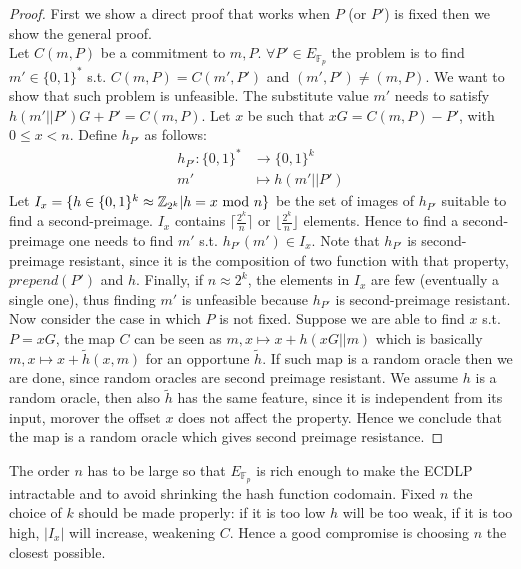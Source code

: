 \begin{proof}
	First we show a direct proof that works when $P$ (or $P'$) is fixed then we show the general proof.
	\\
	Let $C(m,P)$ be a commitment to $m, P$.
	$\forall P' \in E_{\mathbb{F}_p}$ the problem is to find $m' \in \{0,1\}^*$ s.t. $C(m,P)=C(m',P')$ and $(m', P') \neq (m, P)$. We want to show that such problem is unfeasible.
	The substitute value $m'$ needs to satisfy $h(m'||P')G + P'=C(m,P)$.
	Let $x$ be such that $xG = C(m,P) - P'$, with $0\leq x<n$. 
	Define $h_{P'}$ as follows:
	\begin{equation}
	\begin{split}
	h_{P'}:\{0,1\}^* & \rightarrow \{0,1\}^k\\
	m' & \mapsto h(m'||P')
	\end{split}
	\end{equation}
	Let $I_x=\{h \in \{0,1\}^k \approx \mathbb{Z}_{2^k} | h=x\textmd{ mod }n\}$ be the set of images of $h_{P'}$ suitable to find a second-preimage.
	$I_x$ contains  $\lceil\frac{2^k}{n}\rceil$ or $\lfloor\frac{2^k}{n}\rfloor$ elements.
	Hence to find a second-preimage one needs to find $m'$ s.t. $h_{P'}(m') \in I_x$. Note that $h_{P'}$ is second-preimage resistant, since it is the composition of two function with that property, $prepend(P')$ and $h$. Finally, if $n \approx 2^k$, the elements in $I_x$ are few (eventually a single one), thus finding $m'$ is unfeasible because $h_{P'}$ is second-preimage resistant.
	\\
	Now consider the case in which $P$ is not fixed.
	Suppose we are able to find $x$ s.t. $P=xG$, the map $C$ can be seen as $m,x \mapsto x + h(xG||m)$ which is basically $m,x \mapsto x + \tilde{h}(x,m)$ for an opportune $\tilde{h}$.
	If such map is a random oracle then we are done, since random oracles are second preimage resistant.
	We assume $h$ is a random oracle, then also $\tilde{h}$ has the same feature, since it is independent from its input, morover the offset $x$ does not affect the property. 
	Hence we conclude that the map is a random oracle which gives second preimage resistance.
\end{proof}

The order $n$ has to be large so that $E_{\mathbb{F}_p}$ is rich enough to make the ECDLP intractable and to avoid shrinking the hash function codomain. Fixed $n$ the choice of $k$ should be made properly: if it is too low $h$ will be too weak, if it is too high, $|I_x|$ will increase, weakening $C$. Hence a good compromise is choosing $n$ the closest possible.

